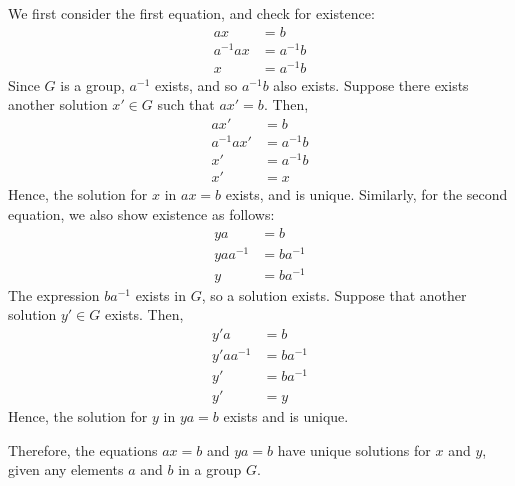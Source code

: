 \begin{enumerate}
\begin{enumerate}
        We first consider the first equation, and check for existence:
        \begin{align*}
            ax &= b \\
            a^{-1}ax &= a^{-1}b \\
            x &= a^{-1}b
        \end{align*}
        Since \(G\) is a group, \(a^{-1}\) exists, and so \(a^{-1}b\) also exists. Suppose there exists another solution \(x'\in G\) such that \(ax' = b\). Then,
        \begin{align*}
            ax' &= b \\
            a^{-1}ax' &= a^{-1}b \\
            x' &= a^{-1}b \\
            x' &= x
        \end{align*}
        Hence, the solution for \(x\) in \(ax = b\) exists, and is unique. Similarly, for the second equation, we also show existence as follows:
        \begin{align*}
            ya &= b \\
            yaa^{-1} &= ba^{-1} \\
            y &= ba^{-1}
        \end{align*}
        The expression \(ba^{-1}\) exists in \(G\), so a solution exists. Suppose that another solution \(y' \in G\) exists. Then,
        \begin{align*}
            y'a &= b \\
            y'aa^{-1} &= ba^{-1} \\
            y' &= ba^{-1} \\
            y' &= y
        \end{align*}
        Hence, the solution for \(y\) in \(ya = b\) exists and is unique.

        Therefore, the equations \(ax = b\) and \(ya = b\) have unique solutions for \(x\) and \(y\), given any elements \(a\) and \(b\) in a group \(G\).
    \end{enumerate}
\end{enumerate}
